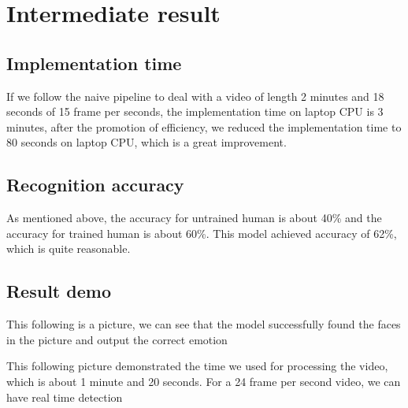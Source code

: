 \section{Intermediate result}
\subsection{Implementation time}
If we follow the naive pipeline to deal with a video of length 2 minutes and 18 seconds of 15 frame per seconds, the implementation time on laptop CPU is 3 minutes, after the promotion of efficiency, we reduced the implementation time to 80 seconds on laptop CPU, which is a great improvement.
\subsection{Recognition accuracy}
As mentioned above, the accuracy for untrained human is about 40\% and the accuracy for trained human is about 60\%. This model achieved accuracy of 62\%, which is quite reasonable.
\subsection{Result demo}
This following is a picture, we can see that the model successfully found the faces in the picture and output the correct emotion

This following picture demonstrated the time we used for processing the video, which is about 1 minute and 20 seconds. For a 24 frame per second video, we can have real time detection

